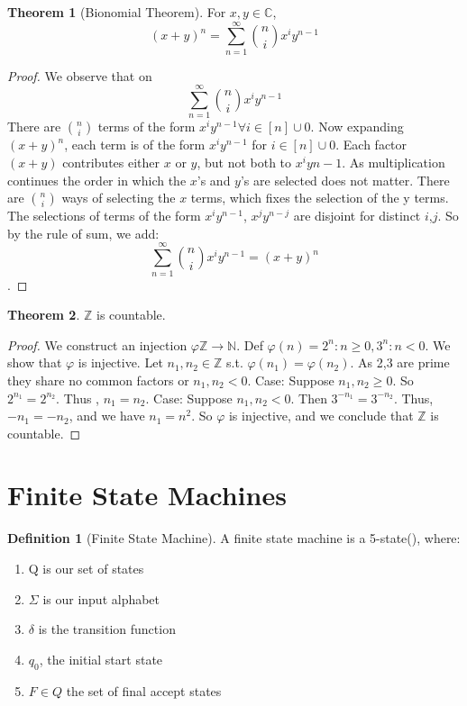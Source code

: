 \documentclass{article}
\theoremstyle{definition}
\newtheorem{define}{Definition}[section]
\newtheorem{thm}{Theorem}[section]
\begin{document}
\begin{thm}[Bionomial Theorem]
For $x,y \in \mathbb{C}$, $$(x+y)^n = {\sum_{n=1}^{\infty}}{{n}\choose{i}}x^{i}y^{n-1}$$
\end{thm}
\begin{proof}
We observe that on $${\sum_{n=1}^{\infty}}{{n}\choose{i}}x^{i}y^{n-1}$$ There are ${n}\choose{i}$
terms of the form $x^{i}y^{n-1} \forall i \in [n]\cup {0}$. Now expanding $(x+y)^n$, each term is of the form $x^{i}y^{n-1}$ for $i \in [n]\cup {0}$. Each factor $(x+y)$ contributes either $x$ or $y$, but not both to $x^{i}y{n-1}$. As multiplication continues the order in which the $x$'s and $y$'s are selected does not matter. There are ${n}\choose{i}$ ways of selecting the $x$ terms, which fixes the selection of the y terms. The selections of terms of the form $x^{i}y^{n-1}$, $x^{j}y^{n-j}$ are disjoint for distinct $i$,$j$. So by the rule of sum, we add: $${\sum_{n=1}^{\infty}}{{n}\choose{i}}x^{i}y^{n-1} = (x+y)^n$$.
\end{proof}

\begin{thm}
$\mathbb{Z}$ is countable.
\end{thm}
\begin{proof}
We construct an injection $\varphi \mathbb{Z} \rightarrow \mathbb{N}$.  Def $\varphi (n) = {2^n: n \geq 0, 3^n: n<0 }$. We show that $\varphi$ is injective. Let $n_1, n_2 \in \mathbb{Z}$ s.t. $\varphi (n_1) = \varphi(n_2)$. As 2,3 are prime they share no common factors or $n_1, n_2 <0$. Case: Suppose $n_1, n_2 \geq 0$. So $2^{n_1}=2^{n_2}$. Thus , $n_1 = n_2$. Case: Suppose $n_1, n_2 <0$. Then $3^{-n_1}=3^{-n_2}$. Thus, $-n_1 = -n_2$, and we have $n_1=n^2$. So $\varphi$ is injective, and we conclude that $\mathbb{Z}$ is countable.
\end{proof}


\section{Finite State Machines}

\begin{define}[Finite State Machine]
A finite state machine is a 5-state(), where:
	\begin{enumerate}
		\item Q is our set of states
		\item $\Sigma$ is our input alphabet
		\item $\delta$ is the transition function
		\item $q_0$, the initial start state
		\item $F \in Q$ the set of final accept states
	\end{enumerate}
\end{define}
\end{document}
